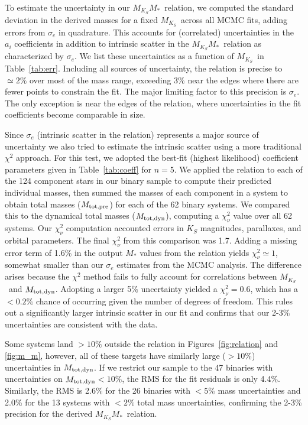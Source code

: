 \documentclass[twocolumn]{aastex62}
\newcommand{\mks}{$M_{K_S}$}
\newcommand{\mmk}{$M_{K_S}$\textendash$M_*$}
\newcommand{\order}{5}
\newcommand{\mpred}{$M_{\rm{tot,pre}}$}
\newcommand{\mdyn}{$M_{\rm{tot,dyn}}$}
\begin{document}
To estimate the uncertainty in our \mmk\ relation, we computed the standard deviation in the derived masses for a fixed \mks\ across all MCMC fits, adding errors from $\sigma_e$ in quadrature. This accounts for (correlated) uncertainties in the $a_i$ coefficients in addition to intrinsic scatter in the \mmk\ relation as characterized by $\sigma_e$. We list these uncertainties as a function of \mks\ in Table~\ref{tab:err}. Including all sources of uncertainty, the relation is precise to $\simeq2\%$ over most of the mass range, exceeding $3\%$ near the edges where there are fewer points to constrain the fit. The major limiting factor to this precision is $\sigma_e$. The only exception is near the edges of the relation, where uncertainties in the fit coefficients become comparable in size. 

Since $\sigma_e$ (intrinsic scatter in the relation) represents a major source of uncertainty we also tried to estimate the intrinsic scatter using a more traditional $\chi^2$ approach. For this test, we adopted the best-fit (highest likelihood) coefficient parameters given in Table~\ref{tab:coeff} for $n=\order$. We applied the relation to each of the 124 component stars in our binary sample to compute their predicted individual masses, then summed the masses of each component in a system to obtain total masses (\mpred) for each of the 62 binary systems. We compared this to the dynamical total masses (\mdyn), computing a $\chi^2_\nu$ value over all 62 systems. Our $\chi^2_\nu$ computation accounted errors in $K_S$ magnitudes, parallaxes, and orbital parameters. The final $\chi^2_\nu$ from this comparison was 1.7. Adding a missing error term of 1.6\% in the output $M_*$ values from the relation yields $\chi^2_\nu \simeq 1$, somewhat smaller than our $\sigma_e$ estimates from the MCMC analysis. The difference arises because the $\chi^2$ method fails to fully account for correlations between \mks\ and \mdyn. Adopting a larger 5\% uncertainty yielded a $\chi^2_\nu=0.6$, which has a $<0.2\%$ chance of occurring given the number of degrees of freedom. This rules out a significantly larger intrinsic scatter in our fit and confirms that our 2-3\% uncertainties are consistent with the data. 

Some systems land $>10\%$ outside the relation in Figures~\ref{fig:relation} and \ref{fig:m_m}, however, all of these targets have similarly large ($>10\%$) uncertainties in \mdyn. If we restrict our sample to the 47 binaries with uncertainties on \mdyn$<10\%$, the RMS for the fit residuals is only 4.4\%. Similarly, the RMS is 2.6\% for the 26 binaries with $<5\%$ mass uncertainties and 2.0\% for the 13 systems with $<2\%$ total mass uncertainties, confirming the 2-3\% precision for the derived \mmk\ relation. 
\end{document}
